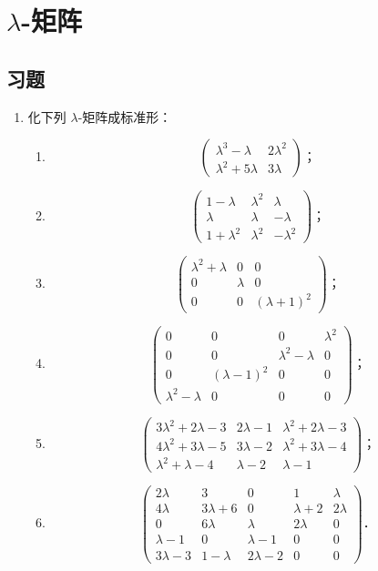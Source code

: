 \chapter{\texorpdfstring{$\lambda$}{λ}-矩阵}

\section{习题}

\begin{enumerate}
  \item 化下列 $\lambda$-矩阵成标准形：
  \begin{enumerate}
    \item \[
    \begin{pmatrix}
      \lambda^3-\lambda & 2\lambda^2 \\
      \lambda^2+5\lambda & 3\lambda
    \end{pmatrix}\text{；}
    \]
  \anssub
    \item \[
    \begin{pmatrix}
      1-\lambda & \lambda^2 & \lambda \\
      \lambda & \lambda & -\lambda \\
      1+\lambda^2 & \lambda^2 & -\lambda^2
    \end{pmatrix}\text{；}
    \]
  \anssub
    \item \[
    \begin{pmatrix}
      \lambda^2+\lambda & 0 & 0 \\
      0 & \lambda & 0 \\
      0 & 0 & (\lambda+1)^2
    \end{pmatrix}\text{；}
    \]
  \anssub
    \item \[
    \begin{pmatrix}
      0 & 0 & 0 & \lambda^2 \\
      0 & 0 & \lambda^2-\lambda & 0 \\
      0 & (\lambda-1)^2 & 0 & 0 \\
      \lambda^2-\lambda & 0 & 0 & 0
    \end{pmatrix}\text{；}
    \]
  \anssub
    \item \[
    \begin{pmatrix}
      3\lambda^2+2\lambda-3 & 2\lambda-1 & \lambda^2+2\lambda-3 \\
      4\lambda^2+3\lambda-5 & 3\lambda-2 & \lambda^2+3\lambda-4 \\
      \lambda^2+\lambda-4 & \lambda-2 & \lambda-1
    \end{pmatrix}\text{；}
    \]
  \anssub
    \item \[
    \begin{pmatrix}
      2\lambda & 3 & 0 & 1 & \lambda \\
      4\lambda & 3\lambda+6 & 0 & \lambda+2 & 2\lambda \\
      0 & 6\lambda & \lambda & 2\lambda & 0 \\
      \lambda-1 & 0 & \lambda-1 & 0 & 0 \\
      3\lambda-3 & 1-\lambda & 2\lambda-2 & 0 & 0
    \end{pmatrix}\text{．}
    \]
  \anssub
  \end{enumerate}


\end{enumerate}
